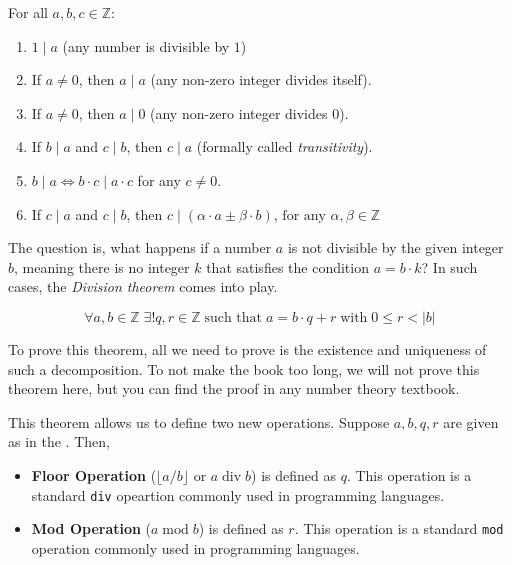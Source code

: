 \documentclass[../lecture-notes-148x210.tex]{subfiles}
\begin{document}
\begin{lemma}
    For all $a, b, c \in \mathbb{Z}:$
    \hfill
    \begin{enumerate}
        \item $1 \mid a$ (any number is divisible by $1$)
        \item If $a \neq 0$, then $a \mid a$ (any non-zero integer divides itself).
        \item If $a \neq 0$, then $a \mid 0$ (any non-zero integer divides $0$).
        \item If $b \mid a$ and $c \mid b$, then $c \mid a$ (formally called \emph{transitivity}).
        \item $b \mid a \iff b \cdot c \mid a \cdot c$ for any $c \neq 0$.
        \item If $c \mid a$ and $c \mid b$, then $c \mid (\alpha \cdot a \pm \beta \cdot b)$, $\text{for any } \alpha, \beta \in \mathbb{Z}$
    \end{enumerate}
\end{lemma}

The question is, what happens if a number $a$ is not divisible by the given integer $b$, 
meaning there is no integer $k$ that satisfies the condition $a = b \cdot k$? 
In such cases, the \emph{Division theorem} comes into play.

\begin{theorem}\label{th:division}
    \begin{equation*}
        \forall a, b \in \mathbb{Z} \; \exists! q, r \in \mathbb{Z} \; \text{such that} \; a = b \cdot q + r \; \text{with} \; 0 \leq r < |b|
    \end{equation*}
\end{theorem}

To prove this theorem, all we need to prove is the existence and uniqueness of
such a decomposition. To not make the book too long, we will not prove this
theorem here, but you can find the proof in any number theory textbook.

This theorem allows us to define two new operations. Suppose $a,b,q,r$ are given
as in the . Then,
\begin{itemize}
    \item \textbf{Floor Operation} ($\lfloor a/b \rfloor$ or $a \; \text{div} \; b$) is defined
    as $q$. This operation is a standard \texttt{div} opeartion commonly used in programming languages.
    \item \textbf{Mod Operation} ($a \; \text{mod} \; b$) is defined as $r$. This operation is a standard
\texttt{mod} operation commonly used in programming languages. 
\end{itemize}
\end{document}
